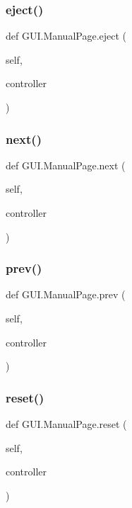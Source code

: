 \subsubsection{\texorpdfstring{eject()}{eject()}}
{\footnotesize\ttfamily def G\+U\+I.\+Manual\+Page.\+eject (\begin{DoxyParamCaption}\item[{}]{self,  }\item[{}]{controller }\end{DoxyParamCaption})}

\mbox{\label{class_g_u_i_1_1_manual_page_a3edbdcd63e5dcb8fc7e1c9b21110206e}} 
\subsubsection{\texorpdfstring{next()}{next()}}
{\footnotesize\ttfamily def G\+U\+I.\+Manual\+Page.\+next (\begin{DoxyParamCaption}\item[{}]{self,  }\item[{}]{controller }\end{DoxyParamCaption})}

\mbox{\label{class_g_u_i_1_1_manual_page_a03fe8089188d5fd8ccc6f8a26a516383}} 
\subsubsection{\texorpdfstring{prev()}{prev()}}
{\footnotesize\ttfamily def G\+U\+I.\+Manual\+Page.\+prev (\begin{DoxyParamCaption}\item[{}]{self,  }\item[{}]{controller }\end{DoxyParamCaption})}

\mbox{\label{class_g_u_i_1_1_manual_page_a1b062258c6e05d3477ebcf94d5deff3b}} 
\subsubsection{\texorpdfstring{reset()}{reset()}}
{\footnotesize\ttfamily def G\+U\+I.\+Manual\+Page.\+reset (\begin{DoxyParamCaption}\item[{}]{self,  }\item[{}]{controller }\end{DoxyParamCaption})}


